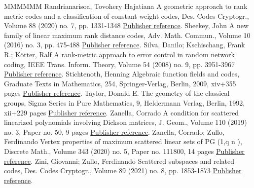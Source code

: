\documentclass[11pt]{article}
\theoremstyle{definition}
\numberwithin{equation}{section}
\begin{document}
\begin{thebibliography}{MMMMMM}
 Randrianarisoa, Tovohery Hajatiana A geometric approach to rank metric codes and a classification of constant weight codes, Des. Codes Cryptogr., Volume 88 (2020) no. 7, pp. 1331-1348 \href{https://alco.centre-mersenne.org/articles/10.5802/alco.377/#randrianarisoa2020geometric}{Publisher reference}.
 Sheekey, John A new family of linear maximum rank distance codes, Adv. Math. Commun., Volume 10 (2016) no. 3, pp. 475-488 \href{https://alco.centre-mersenne.org/articles/10.5802/alco.377/#sheekey2016new}{Publisher reference}.
 Silva, Danilo; Kschischang, Frank R.; Kötter, Ralf A rank-metric approach to error control in random network coding, IEEE Trans. Inform. Theory, Volume 54 (2008) no. 9, pp. 3951-3967 \href{https://alco.centre-mersenne.org/articles/10.5802/alco.377/#MR2450762}{Publisher reference}.
 Stichtenoth, Henning Algebraic function fields and codes, Graduate Texts in Mathematics, 254, Springer-Verlag, Berlin, 2009, xiv+355 pages \href{https://alco.centre-mersenne.org/articles/10.5802/alco.377/#Stichtenoth}{Publisher reference}.
 Taylor, Donald E. The geometry of the classical groups, Sigma Series in Pure Mathematics, 9, Heldermann Verlag, Berlin, 1992, xii+229 pages \href{https://alco.centre-mersenne.org/articles/10.5802/alco.377/#taylor1992geometry}{Publisher reference}.
 Zanella, Corrado A condition for scattered linearized polynomials involving Dickson matrices, J. Geom., Volume 110 (2019) no. 3, Paper no. 50, 9 pages \href{https://alco.centre-mersenne.org/articles/10.5802/alco.377/#zanella2019condition}{Publisher reference}.
 Zanella, Corrado; Zullo, Ferdinando Vertex properties of maximum scattered linear sets of  PG (1,q n ), Discrete Math., Volume 343 (2020) no. 5, Paper no. 111800, 14 pages \href{https://alco.centre-mersenne.org/articles/10.5802/alco.377/#zanella2020vertex}{Publisher reference}.
 Zini, Giovanni; Zullo, Ferdinando Scattered subspaces and related codes, Des. Codes Cryptogr., Volume 89 (2021) no. 8, pp. 1853-1873 \href{https://alco.centre-mersenne.org/articles/10.5802/alco.377/#zini2021scattered}{Publisher reference}.
\end{thebibliography}
\end{document}
